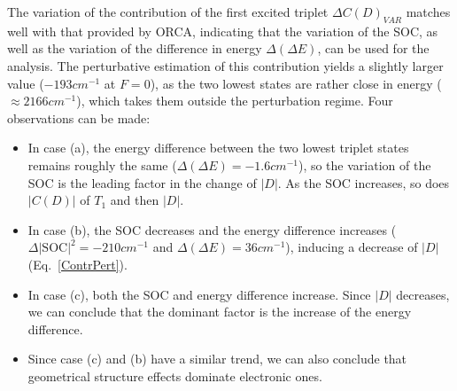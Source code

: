 \documentclass[12pt,a4paper]{report}
\numberwithin{equation}{section}
\begin{document}
The variation of the contribution of the first excited triplet $\Delta C(D)_{VAR}$ matches well with that provided by ORCA, indicating that the variation of the SOC, as well as the variation of the difference in energy $\Delta (\Delta E)$, can be used for the analysis.
The perturbative estimation of this contribution yields a slightly larger value ($-193 cm^{-1}$ at $F=0$), as the two lowest states are rather close in energy ($\approx 2166 cm^{-1}$), which takes them outside the perturbation regime.
Four observations can be made:
\begin{itemize}
\item In case (a), the energy difference between the two lowest triplet states remains roughly the same ($\Delta(\Delta E)=-1.6cm^{-1}$), so the variation of the SOC is the leading factor in the change of $|D|$. As the SOC increases, so does $|C(D)|$ of $T_1$ and then $|D|$.

\item In case (b), the SOC decreases and the energy difference increases ($\Delta|\text{SOC}|^2=-210cm^{-1}$ and $\Delta(\Delta E)=36cm^{-1}$), inducing a decrease of $|D|$ (Eq.~\ref{ContrPert}).

\item In case (c), both the SOC and energy difference increase. Since $|D|$ decreases, we can conclude that the dominant factor is the increase of the energy difference.

\item Since case (c) and (b) have a similar trend, we can also conclude that geometrical structure effects dominate electronic ones.

\end{itemize}
\end{document}
